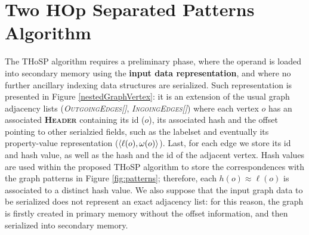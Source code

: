 \section{Two HOp Separated Patterns Algorithm}
\label{sec:THOSPA}
The THoSP algorithm requires a preliminary phase, where the operand is loaded into secondary memory using the \textbf{input data  representation}, and where no further ancillary indexing data structures are serialized. Such representation is presented in Figure \ref{nestedGraphVertex}: it is an extension of the usual graph adjacency lists (\textit{\textsc{OutgoingEdges[]}}, \textit{\textsc{IngoingEdges[]}}) where each vertex $o$ has an associated \textbf{\textsc{Header}} containing its id ($o$), its associated hash and the offset pointing to other serialzied fields, such as the labelset and eventually its property-value representation ($\Braket{\ell(o),\omega(o)}$). Last, for each edge we store its id and hash value, as well as the hash and the id of the adjacent vertex. Hash values are used within the proposed THoSP algorithm to store the correspondences with the graph patterns in Figure \ref{fig:patterns}; therefore, each $h(o)\approx \ell(o)$ is associated to a distinct hash value. We also suppose that the input graph data to be serialized does not represent an exact adjacency list: for this reason, the graph is firstly created in primary memory without the offset information, and then serialized into secondary memory. 

